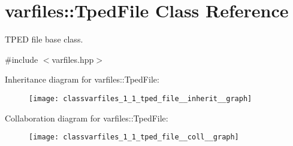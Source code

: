 \hypertarget{classvarfiles_1_1_tped_file}{}\section{varfiles\+:\+:Tped\+File Class Reference}
\label{classvarfiles_1_1_tped_file}


T\+P\+ED file base class.  




{\ttfamily \#include $<$varfiles.\+hpp$>$}



Inheritance diagram for varfiles\+:\+:Tped\+File\+:\nopagebreak
\begin{figure}[H]
\begin{center}
\leavevmode
\texttt{[image: classvarfiles\_1\_1\_tped\_file\_\_inherit\_\_graph]}
\end{center}
\end{figure}


Collaboration diagram for varfiles\+:\+:Tped\+File\+:\nopagebreak
\begin{figure}[H]
\begin{center}
\leavevmode
\texttt{[image: classvarfiles\_1\_1\_tped\_file\_\_coll\_\_graph]}
\end{center}
\end{figure}
